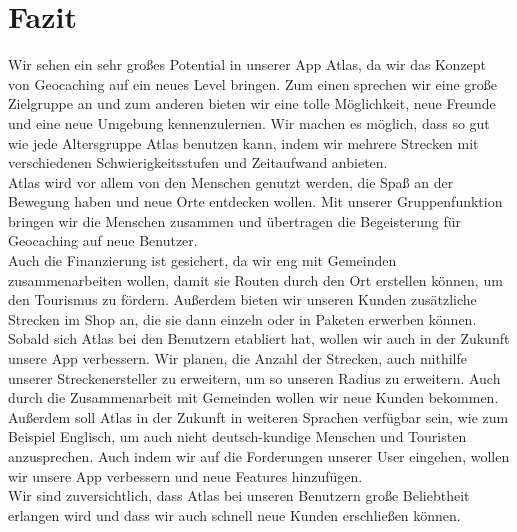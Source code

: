 \documentclass[a4paper, 12pp]{article}
\begin{document}
\section{Fazit}
Wir sehen ein sehr großes Potential in unserer App Atlas, da wir das Konzept von Geocaching auf ein neues Level bringen. Zum einen sprechen wir eine große Zielgruppe an und zum anderen bieten wir eine tolle Möglichkeit, neue Freunde und eine neue Umgebung kennenzulernen. Wir machen es möglich, dass so gut wie jede Altersgruppe Atlas benutzen kann, indem wir mehrere Strecken mit verschiedenen Schwierigkeitsstufen und Zeitaufwand anbieten.\\
Atlas wird vor allem von den Menschen genutzt werden, die Spaß an der Bewegung haben und neue Orte entdecken wollen. Mit unserer Gruppenfunktion bringen wir die Menschen zusammen und übertragen die Begeisterung für Geocaching auf neue Benutzer.\\
Auch die Finanzierung ist gesichert, da wir eng mit Gemeinden zusammenarbeiten wollen, damit sie Routen durch den Ort erstellen können, um den Tourismus zu fördern. Außerdem bieten wir unseren Kunden zusätzliche Strecken im Shop an, die sie dann einzeln oder in Paketen erwerben können.\\
Sobald sich Atlas bei den Benutzern etabliert hat, wollen wir auch in der Zukunft unsere App verbessern. Wir planen, die Anzahl der Strecken, auch mithilfe unserer Streckenersteller zu erweitern, um so unseren Radius zu erweitern. Auch durch die Zusammenarbeit mit Gemeinden wollen wir neue Kunden bekommen. Außerdem soll Atlas in der Zukunft in weiteren Sprachen verfügbar sein, wie zum Beispiel Englisch, um auch nicht deutsch-kundige Menschen und Touristen anzusprechen. Auch indem wir auf die Forderungen unserer User eingehen, wollen wir unsere App verbessern und neue Features hinzufügen.\\
Wir sind zuversichtlich, dass Atlas bei unseren Benutzern große Beliebtheit erlangen wird und dass wir auch schnell neue Kunden erschließen können.\\
\end{document}
